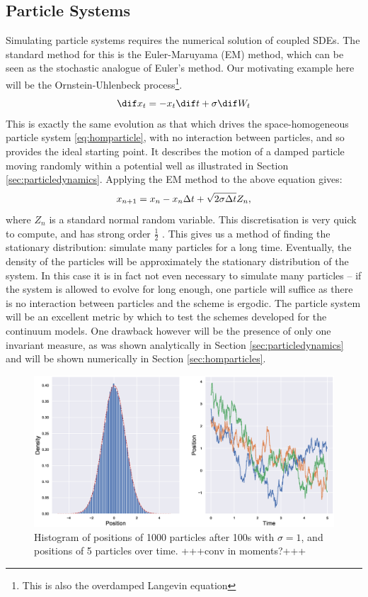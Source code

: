 \subsection{Particle Systems}\label{sec:homparticlesystem}
Simulating particle systems requires the numerical solution of coupled SDEs. The standard method for this is the Euler-Maruyama (EM) method, which can be seen as the stochastic analogue of Euler's method. Our motivating example here will be the Ornstein-Uhlenbeck process\footnote{This is also the overdamped Langevin equation}. 
\begin{equation}
\dif x_t = - x_t \dif t + \sigma \dif W_t
\end{equation}
This is exactly the same evolution as that which drives the space-homogeneous particle system \eqref{eq:homparticle}, with no interaction between particles, and so provides the ideal starting point. It describes the motion of a damped particle moving randomly within a potential well as illustrated in Section \ref{sec:particledynamics}. Applying the EM method to the above equation gives:
\[ x_{n+1} = x_n -  x_n\Delta t + \sqrt{2\sigma\Delta t}Z_n,  \]
where $Z_n$ is a standard normal random variable. This discretisation is very quick to compute, and has strong order $\frac{1}{2}$ \cite{Higham01}. This gives us a method of finding the stationary distribution: simulate many particles for a long time. Eventually, the density of the particles will be approximately the stationary distribution of the system. In this case it is in fact not even necessary to simulate many particles -- if the system is allowed to evolve for long enough, one particle will suffice as there is no interaction between particles and the scheme is ergodic. The particle system will be an excellent metric by which to test the schemes developed for the continuum models. One drawback however will be the presence of only one invariant measure, as was shown analytically in Section \ref{sec:particledynamics} and will be shown numerically in Section \ref{sec:homparticles}.
\begin{figure}
    \centering
    \includegraphics[width=\linewidth]{Figures/OUparticletraj}
    \caption{Histogram of positions of 1000 particles after 100s with $\sigma = 1$, and positions of 5 particles over time. +++conv in moments?+++}
    \label{fig:ouparticletraj}
\end{figure}

